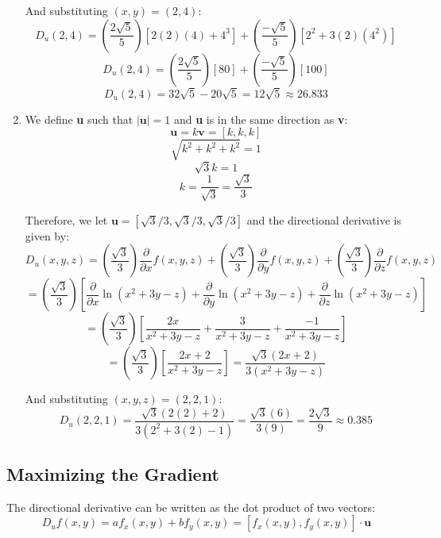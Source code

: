 \begin{Answer}[ref = direction]
\begin{enumerate}
    And substituting $(x, y) = (2, 4)$:
    $$D_u(2, 4) = \left( \frac{2\sqrt{5}}{5} \right) \left[ 2(2)(4) + 4^3 
    \right] + \left( \frac{-\sqrt{5}}{5} \right) \left[ 2^2 + 3(2)(4^2) 
    \right]$$
    $$D_u(2, 4) = \left( \frac{2\sqrt{5}}{5} \right) \left[ 80 \right] + \left(
    \frac{-\sqrt{5}}{5} \right) \left[ 100 \right]$$
    $$D_u(2, 4) = 32\sqrt{5} - 20\sqrt{5} = 12\sqrt{5} \approx 26.833$$

    \item We define \textbf{u} such that $| \textbf{u} | = 1$ and \textbf{u} 
    is in the same direction as \textbf{v}:
    $$\textbf{u} = k\textbf{v} = \left[k, k, k \right]$$
    $$\sqrt{k^2 + k^2 + k^2} = 1$$
    $$\sqrt{3}k = 1$$
    $$k = \frac{1}{\sqrt{3}} = \frac{\sqrt{3}}{3}$$

    Therefore, we let $\textbf{u} = \left[ \sqrt{3}/3, \sqrt{3}/3, \sqrt{3}/3 
    \right]$ and the directional derivative is given by:
    $$D_u(x, y, z) = \left( \frac{\sqrt{3}}{3} \right) \frac{\partial}{
    \partial x} f(x, y, z) + \left( \frac{\sqrt{3}}{3} \right) \frac{
    \partial}{\partial y}f(x, y, z) + \left( \frac{\sqrt{3}}{3} \right) 
    \frac{\partial}{\partial z} f(x, y, z)$$
    $$= \left( \frac{\sqrt{3}}{3} \right) \left[ \frac{\partial}{\partial x} 
    \ln{ \left( x^2 + 3y - z \right)} + \frac{\partial}{\partial y} \ln{ 
    \left( x^2 + 3y - z \right)} + \frac{\partial}{\partial z} \ln{ \left( 
    x^2 + 3y - z \right)} \right]$$
    $$= \left( \frac{\sqrt{3}}{3} \right) \left[ \frac{2x}{x^2 + 3y - z} + 
    \frac{3}{x^2 + 3y - z} + \frac{-1}{x^2 + 3y - z} \right]$$
    $$= \left( \frac{\sqrt{3}}{3} \right) \left[ \frac{2x + 2}{x^2 + 3y - z} 
    \right] = \frac{\sqrt{3} \left( 2x + 2 \right)}{3 \left( x^2 + 3y - z 
    \right)}$$

    And substituting $(x, y, z) = (2, 2, 1)$:
    $$D_u(2, 2, 1) = \frac{\sqrt{3} \left( 2(2) + 2 \right)}{3 \left( 2^2 + 
    3(2) - 1 \right)} = \frac{\sqrt{3} \left( 6 \right)}{3 \left( 9 \right)} 
    = \frac{2\sqrt{3}}{9} \approx 0.385$$
\end{enumerate}
\end{Answer}

\subsection{Maximizing the Gradient}
The directional derivative can be written as the dot product of two vectors:
$$D_u f(x, y) = af_x(x, y) + bf_y(x, y) = \left[ f_x(x, y), f_y(x, y) \right] 
\cdot \textbf{u}$$

